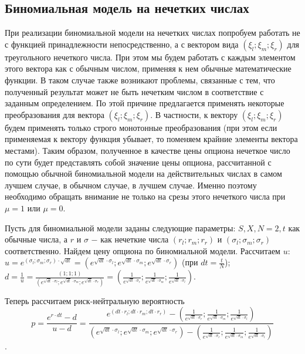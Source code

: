 \documentclass[a4paper,12pt]{extarticle} %
\begin{document}
	\subsection{Биномиальная модель на нечетких числах}
	При реализации биномиальной модели на нечетких числах попробуем работать не с функцией принадлежности непосредственно, а с вектором вида $(\xi_l;\xi_m;\xi_r)$ для треугольного нечеткого числа. При этом мы будем работать с каждым элементом этого вектора как с обычным числом, применяя к нем обычные математические функции. В таком случае также возникают проблемы, связанные с тем, что полученный результат может не быть нечетким числом в соответствие с заданным определением. По этой причине предлагается применять некоторые преобразования для вектора $(\xi_l;\xi_m;\xi_r)$. В частности, к вектору $(\xi_l;\xi_m;\xi_r)$ будем применять только строго монотонные преобразования (при этом если применяемая к вектору функция убывает, то поменяем крайние элементы вектора местами). Таким образом, полученное в качестве цены опциона нечеткое число по сути будет представлять собой значение цены опциона, рассчитанной с помощью обычной биномиальной модели на действительных числах в самом лучшем случае, в обычном случае, в лучшем случае. Именно поэтому необходимо обращать внимание не только на срезы этого нечеткого числа при $\mu=1$ или $\mu=0$. 
	
	Пусть для биномиальной модели заданы следующие параметры: $S, X, N=2, t$ как обычные числа, а $r$ и $\sigma$ $-$ как нечеткие числа $(r_l;r_m;r_r)$ и $(\sigma_l;\sigma_m;\sigma_r)$ соответственно. Найдем цену опциона по биномиальной модели. Рассчитаем $u$: 
	$u=e^{(\sigma_l;\sigma_m;\sigma_r) \cdot \sqrt{dt}} = (e^{\sqrt{dt} \cdot \sigma_l};e^{\sqrt{dt} \cdot \sigma_m};e^{\sqrt{dt} \cdot \sigma_r})$ (при $dt=\frac{t}{N}$); 
	$d=\frac{1}{u}=\frac{(1;1;1)}{(e^{\sqrt{dt} \cdot \sigma_l};e^{\sqrt{dt} \cdot \sigma_m};e^{\sqrt{dt} \cdot \sigma_r})}=(\frac{1}{e^{\sqrt{dt} \cdot \sigma_r}};\frac{1}{e^{\sqrt{dt} \cdot \sigma_m}};\frac{1}{e^{\sqrt{dt} \cdot \sigma_l}})$. 
	
	Теперь рассчитаем риск-нейтральную вероятность \[p=\frac{e^{r \cdot dt}-d}{u-d}=\frac{e^{(dt \cdot r_l;dt \cdot r_m;dt \cdot r_r)}-\left(\frac{1}{e^{\sqrt{dt} \cdot \sigma_r}};\frac{1}{e^{\sqrt{dt} \cdot \sigma_m}};\frac{1}{e^{\sqrt{dt} \cdot \sigma_l}}\right)}{(e^{\sqrt{dt} \cdot \sigma_l};e^{\sqrt{dt} \cdot \sigma_m};e^{\sqrt{dt} \cdot \sigma_r})-\left(\frac{1}{e^{\sqrt{dt} \cdot \sigma_r}};\frac{1}{e^{\sqrt{dt} \cdot \sigma_m}};\frac{1}{e^{\sqrt{dt} \cdot \sigma_l}}\right)}\].
	
\end{document}

